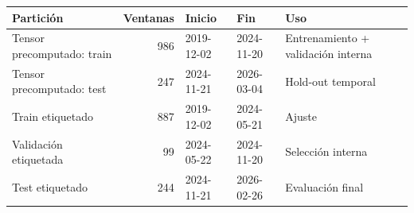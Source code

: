 \begin{tabular}{p{}rllp{}}
\toprule
                 Partición &  Ventanas &     Inicio &        Fin &                                Uso \\
\midrule
Tensor precomputado: train &       986 & 2019-12-02 & 2024-11-20 & Entrenamiento + validación interna \\
 Tensor precomputado: test &       247 & 2024-11-21 & 2026-03-04 &                  Hold-out temporal \\
          Train etiquetado &       887 & 2019-12-02 & 2024-05-21 &                             Ajuste \\
     Validación etiquetada &        99 & 2024-05-22 & 2024-11-20 &                  Selección interna \\
           Test etiquetado &       244 & 2024-11-21 & 2026-02-26 &                   Evaluación final \\
\bottomrule
\end{tabular}
